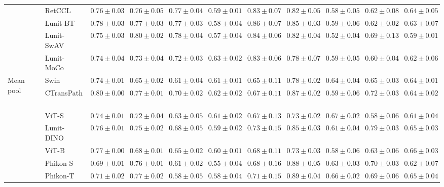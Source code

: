 \begin{tabular}{ll|cccc|c|cccc}
 & RetCCL~\cite{wang2023retccl} & $0.76 \pm 0.03$ & $0.76 \pm 0.05$ & $0.77 \pm 0.04$ & $0.59 \pm 0.01$ & $0.83 \pm 0.07$ & $0.82 \pm 0.05$ & $0.58 \pm 0.05$ & $0.62 \pm 0.08$ & $0.64 \pm 0.05$ \\
 & Lunit-BT~\cite{kang2023benchmarking} & $0.78 \pm 0.03$ & $0.77 \pm 0.03$ & $0.77 \pm 0.03$ & $0.58 \pm 0.04$ & $0.86 \pm 0.07$ & $0.85 \pm 0.03$ & $0.59 \pm 0.06$ & $0.62 \pm 0.02$ & $0.63 \pm 0.07$ \\
 & Lunit-SwAV~\cite{kang2023benchmarking} & $0.75 \pm 0.03$ & $\mathbf{0.80 \pm 0.02}$ & $0.78 \pm 0.04$ & $0.57 \pm 0.04$ & $0.84 \pm 0.06$ & $0.82 \pm 0.04$ & $0.52 \pm 0.04$ & $0.69 \pm 0.13$ & $0.59 \pm 0.01$ \\
 & Lunit-MoCo~\cite{kang2023benchmarking} & $0.74 \pm 0.04$ & $0.73 \pm 0.04$ & $0.72 \pm 0.03$ & $\mathbf{0.63 \pm 0.02}$ & $0.83 \pm 0.06$ & $0.78 \pm 0.07$ & $0.59 \pm 0.05$ & $0.60 \pm 0.04$ & $0.62 \pm 0.06$ \\
\cline{1-11}
\multirow[t]{12}{*}{Mean pool} & Swin~\cite{liu2021swin} & $0.74 \pm 0.01$ & $0.65 \pm 0.02$ & $0.61 \pm 0.04$ & $0.61 \pm 0.01$ & $0.65 \pm 0.11$ & $0.78 \pm 0.02$ & $0.64 \pm 0.04$ & $0.65 \pm 0.03$ & $0.64 \pm 0.01$ \\
 & CTransPath~\cite{wang2022transformer} & $\mathbf{0.80 \pm 0.00}$ & $0.77 \pm 0.01$ & $\mathbf{0.70 \pm 0.02}$ & $\mathbf{0.62 \pm 0.02}$ & $0.67 \pm 0.11$ & $0.87 \pm 0.02$ & $0.59 \pm 0.06$ & $0.72 \pm 0.03$ & $0.64 \pm 0.02$ \\
 & ViT-S~\cite{kolesnikov2021image} & $0.74 \pm 0.01$ & $0.72 \pm 0.04$ & $0.63 \pm 0.05$ & $0.61 \pm 0.02$ & $0.67 \pm 0.13$ & $0.73 \pm 0.02$ & $\mathbf{0.67 \pm 0.02}$ & $0.58 \pm 0.06$ & $0.61 \pm 0.04$ \\
 & Lunit-DINO~\cite{kang2023benchmarking} & $0.76 \pm 0.01$ & $0.75 \pm 0.02$ & $0.68 \pm 0.05$ & $0.59 \pm 0.02$ & $\mathbf{0.73 \pm 0.15}$ & $0.85 \pm 0.03$ & $0.61 \pm 0.04$ & $\mathbf{0.79 \pm 0.03}$ & $0.65 \pm 0.03$ \\
 & ViT-B~\cite{kolesnikov2021image} & $0.77 \pm 0.00$ & $0.68 \pm 0.01$ & $0.65 \pm 0.02$ & $0.60 \pm 0.01$ & $0.68 \pm 0.11$ & $0.73 \pm 0.03$ & $0.58 \pm 0.06$ & $0.63 \pm 0.06$ & $0.66 \pm 0.03$ \\
 & Phikon-S~\cite{filiot2023scaling} & $0.69 \pm 0.01$ & $0.76 \pm 0.01$ & $0.61 \pm 0.02$ & $0.55 \pm 0.04$ & $0.68 \pm 0.16$ & $0.88 \pm 0.05$ & $0.63 \pm 0.03$ & $0.70 \pm 0.03$ & $0.62 \pm 0.07$ \\
 & Phikon-T~\cite{filiot2023scaling} & $0.71 \pm 0.02$ & $\mathbf{0.77 \pm 0.02}$ & $0.58 \pm 0.05$ & $0.58 \pm 0.04$ & $0.71 \pm 0.15$ & $\mathbf{0.89 \pm 0.04}$ & $0.66 \pm 0.02$ & $0.69 \pm 0.06$ & $0.65 \pm 0.04$ \\

\end{tabular}
